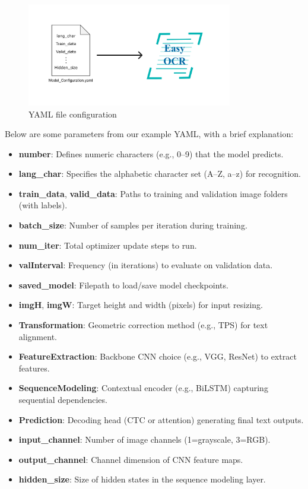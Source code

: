 \begin{figure}[H]
    \centering
    \includegraphics[width=0.80\textwidth]{Figures/Chapter 3/YAML_Configuration.jpg}
    \caption{YAML file configuration}
    \label{fig:YAMLConfiguration}
\end{figure}

Below are some parameters from our example YAML, with a brief explanation:

\begin{itemize}
  \item \textbf{number}: Defines numeric characters (e.g., 0--9) that the model predicts.
  \item \textbf{lang\_char}: Specifies the alphabetic character set (A--Z, a--z) for recognition.
  \item \textbf{train\_data}, \textbf{valid\_data}: Paths to training and validation image folders (with labels).
  \item \textbf{batch\_size}: Number of samples per iteration during training.
  \item \textbf{num\_iter}: Total optimizer update steps to run.
  \item \textbf{valInterval}: Frequency (in iterations) to evaluate on validation data.
  \item \textbf{saved\_model}: Filepath to load/save model checkpoints.
  \item \textbf{imgH}, \textbf{imgW}: Target height and width (pixels) for input resizing.
  \item \textbf{Transformation}: Geometric correction method (e.g., TPS) for text alignment.
  \item \textbf{FeatureExtraction}: Backbone CNN choice (e.g., VGG, ResNet) to extract features.
  \item \textbf{SequenceModeling}: Contextual encoder (e.g., BiLSTM) capturing sequential dependencies.
  \item \textbf{Prediction}: Decoding head (CTC or attention) generating final text outputs.
  \item \textbf{input\_channel}: Number of image channels (1=grayscale, 3=RGB).
  \item \textbf{output\_channel}: Channel dimension of CNN feature maps.
  \item \textbf{hidden\_size}: Size of hidden states in the sequence modeling layer.
\end{itemize}


